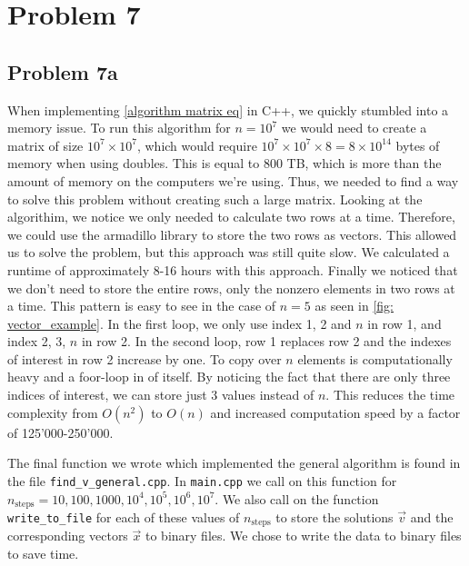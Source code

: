 \documentclass[english,notitlepage]{revtex4-1}  %
\begin{document}
\section*{Problem 7}
\subsection*{Problem 7a}
When implementing \cref{algorithm matrix eq} in C++, we quickly stumbled into a memory issue. To run this algorithm for $n=10^7$ we would need to create a matrix of size $10^7 \times 10^7$, which would require $10^7 \times 10^7 \times 8 = 8 × 10^{14}$ bytes of memory when using doubles. This is equal to 800 TB, which is more than the amount of memory on the computers we're using. Thus, we needed to find a way to solve this problem without creating such a large matrix. Looking at the algorithim, we notice we only needed to calculate two rows at a time. Therefore, we could use the armadillo library to store the two rows as vectors. This allowed us to solve the problem, but this approach was still quite slow. We calculated a runtime of approximately 8-16 hours with this approach. Finally we noticed that we don't need to store the entire rows, only the nonzero elements in two rows at a time. This pattern is easy to see in the case of $n=5$ as seen in \cref{fig: vector_example}. In the first loop, we only use index 1, 2 and $n$ in row 1, and index 2, 3, $n$ in row 2. In the second loop, row 1 replaces row 2 and the indexes of interest in row 2 increase by one. To copy over $n$ elements is computationally heavy and a foor-loop in of itself. By noticing the fact that there are only three indices of interest, we can store just 3 values instead of $n$. This reduces the time complexity from $O(n^2)$ to $O(n)$ and increased computation speed by a factor of 125'000-250'000.

The final function we wrote which implemented the general algorithm is found in the file \verb|find_v_general.cpp|. In \verb|main.cpp| we call on this function for $n_\text{steps} = 10, 100, 1000, 10^4, 10^5, 10^6, 10^7$. We also call on the function \verb|write_to_file| for each of these values of $n_\text{steps}$ to store the solutions $\vec{v}$ and the corresponding vectors $\vec{x}$ to binary files. We chose to write the data to binary files to save time.
\end{document}
